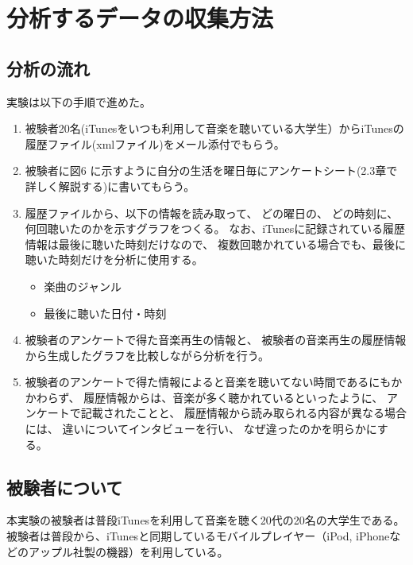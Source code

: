 \documentclass[11pt, onecolumn]{jsarticle}
\begin{document}
\section{分析するデータの収集方法}
\subsection{分析の流れ}
実験は以下の手順で進めた。

\begin{enumerate}
\item
被験者20名(iTunesをいつも利用して音楽を聴いている大学生）からiTunesの履歴ファイル(xmlファイル)をメール添付でもらう。
\item
被験者に図6%
に示すように自分の生活を曜日毎にアンケートシート(2.3章で詳しく解説する)に書いてもらう。
\item
履歴ファイルから、以下の情報を読み取って、
どの曜日の、
どの時刻に、
何回聴いたのかを示すグラフをつくる。
なお、iTunesに記録されている履歴情報は最後に聴いた時刻だけなので、
複数回聴かれている場合でも、最後に聴いた時刻だけを分析に使用する。
\begin{itemize}
\item
楽曲のジャンル
\item
最後に聴いた日付・時刻
\end{itemize}


\item
被験者のアンケートで得た音楽再生の情報と、
被験者の音楽再生の履歴情報から生成したグラフを比較しながら分析を行う。
\item
被験者のアンケートで得た情報によると音楽を聴いてない時間であるにもかかわらず、
履歴情報からは、音楽が多く聴かれているといったように、
アンケートで記載されたことと、
履歴情報から読み取られる内容が異なる場合には、
違いについてインタビューを行い、
なぜ違ったのかを明らかにする。
\end{enumerate}

\subsection{被験者について}
本実験の被験者は普段iTunesを利用して音楽を聴く20代の20名の大学生である。
被験者は普段から、iTunesと同期しているモバイルプレイヤー（iPod, iPhoneなどのアップル社製の機器）を利用している。
\end{document}
